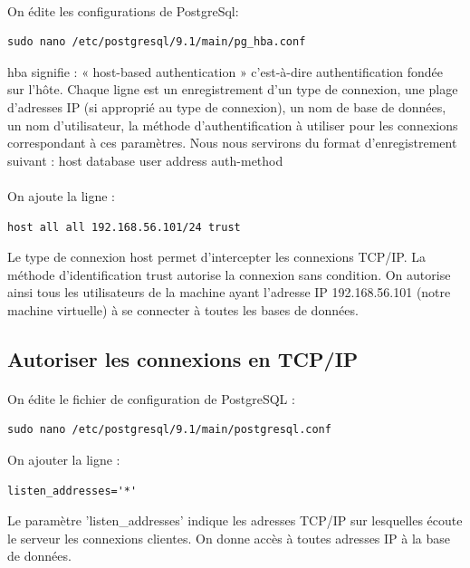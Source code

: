 \documentclass{report}
\begin{document}
			\paragraph{}{
				On édite les configurations de PostgreSql:
\begin{lstlisting}
sudo nano /etc/postgresql/9.1/main/pg_hba.conf
\end{lstlisting}

			hba signifie : « host-based authentication » c’est-à-dire  authentification fondée sur l'hôte. Chaque ligne est un enregistrement d’un type de connexion, une plage d'adresses IP (si approprié au type de connexion), un nom de base de données, un nom d'utilisateur, la méthode d'authentification à utiliser pour les connexions correspondant à ces paramètres. Nous nous servirons du format d’enregistrement suivant : host database user address auth-method
			}


			\paragraph{}{
				On ajoute la ligne :
\begin{lstlisting}
host all all 192.168.56.101/24 trust
\end{lstlisting}
				Le type de connexion host permet d’intercepter les connexions TCP/IP. La méthode d’identification trust autorise la connexion sans condition.
				On autorise ainsi tous les utilisateurs de la machine ayant l’adresse IP 192.168.56.101 (notre machine virtuelle) à se connecter à toutes les bases de données.
			}



		\subsection*{Autoriser les connexions en TCP/IP}

			\paragraph{}{
			On édite le fichier de configuration de PostgreSQL :
\begin{lstlisting}
sudo nano /etc/postgresql/9.1/main/postgresql.conf
\end{lstlisting}

			On ajouter la ligne :
\begin{lstlisting}
listen_addresses='*'
\end{lstlisting}

			Le paramètre 'listen\_addresses' indique les adresses TCP/IP sur lesquelles écoute le serveur les connexions clientes.
			On donne accès à toutes adresses IP à la base de données.
			}
\end{document}
